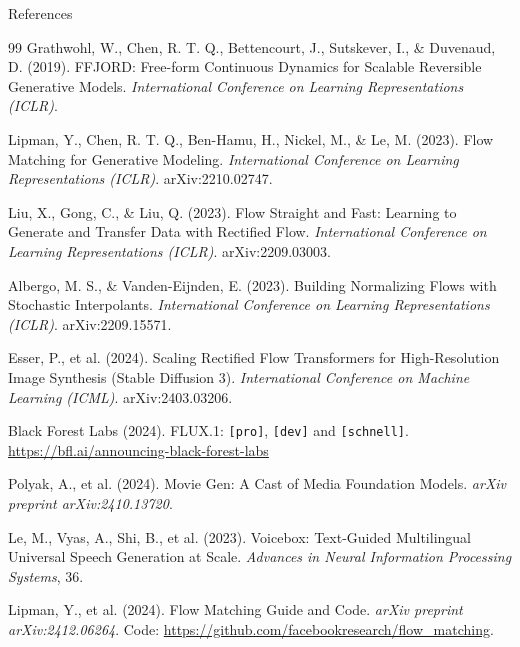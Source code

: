 \begin{frame}[allowframebreaks]{References}
\begin{thebibliography}{99}
    Grathwohl, W., Chen, R. T. Q., Bettencourt, J., Sutskever, I., \& Duvenaud, D. (2019).
    FFJORD: Free-form Continuous Dynamics for Scalable Reversible Generative Models.
    \textit{International Conference on Learning Representations (ICLR)}.

    Lipman, Y., Chen, R. T. Q., Ben-Hamu, H., Nickel, M., \& Le, M. (2023).
    Flow Matching for Generative Modeling.
    \textit{International Conference on Learning Representations (ICLR)}. arXiv:2210.02747.

    Liu, X., Gong, C., \& Liu, Q. (2023).
    Flow Straight and Fast: Learning to Generate and Transfer Data with Rectified Flow.
    \textit{International Conference on Learning Representations (ICLR)}. arXiv:2209.03003.

    Albergo, M. S., \& Vanden-Eijnden, E. (2023).
    Building Normalizing Flows with Stochastic Interpolants.
    \textit{International Conference on Learning Representations (ICLR)}. arXiv:2209.15571.

    Esser, P., et al. (2024).
    Scaling Rectified Flow Transformers for High-Resolution Image Synthesis (Stable Diffusion 3).
    \textit{International Conference on Machine Learning (ICML)}. arXiv:2403.03206.

    Black Forest Labs (2024).
    FLUX.1: \texttt{[pro]}, \texttt{[dev]} and \texttt{[schnell]}.
    \url{https://bfl.ai/announcing-black-forest-labs}

    Polyak, A., et al. (2024).
    Movie Gen: A Cast of Media Foundation Models.
    \textit{arXiv preprint arXiv:2410.13720}.

    Le, M., Vyas, A., Shi, B., et al. (2023).
    Voicebox: Text-Guided Multilingual Universal Speech Generation at Scale.
    \textit{Advances in Neural Information Processing Systems}, 36.

    Lipman, Y., et al. (2024).
    Flow Matching Guide and Code.
    \textit{arXiv preprint arXiv:2412.06264}. Code: \url{https://github.com/facebookresearch/flow_matching}.

    \end{thebibliography}
\end{frame}
